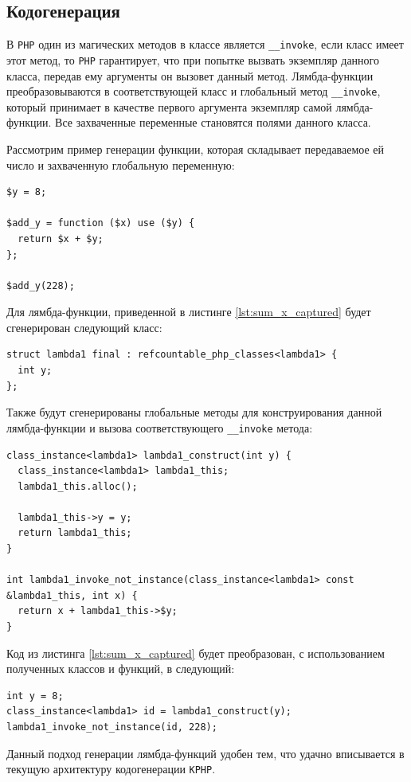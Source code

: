 \subsection{Кодогенерация}
В \verb|PHP| один из магических методов в классе является \verb|__invoke|, если класс имеет этот метод, то \verb|PHP| гарантирует, что при попытке вызвать экземпляр данного класса, передав ему аргументы он вызовет данный метод.
Лямбда-функции преобразовываются в соответствующей класс и глобальный метод \verb|__invoke|, который принимает в качестве первого аргумента экземпляр самой лямбда-функции.
Все захваченные переменные становятся полями данного класса.

Рассмотрим пример генерации функции, которая складывает передаваемое ей число и захваченную глобальную переменную:
\begin{lstlisting}[label={lst:sum_x_captured},caption={Пример функции, добавляющей к аргументу захваченное значение}]
$y = 8;

$add_y = function ($x) use ($y) {
  return $x + $y;
};

$add_y(228);
\end{lstlisting}

Для лямбда-функции, приведенной в листинге \ref{lst:sum_x_captured} будет сгенерирован следующий класс:
\begin{lstlisting}
struct lambda1 final : refcountable_php_classes<lambda1> {
  int y;
};
\end{lstlisting}

Также будут сгенерированы глобальные методы для конструирования данной лямбда-функции и вызова соответствующего \verb|__invoke| метода:
\begin{lstlisting}
class_instance<lambda1> lambda1_construct(int y) {
  class_instance<lambda1> lambda1_this;
  lambda1_this.alloc();

  lambda1_this->y = y;
  return lambda1_this;
}

int lambda1_invoke_not_instance(class_instance<lambda1> const &lambda1_this, int x) {
  return x + lambda1_this->$y;
}
\end{lstlisting}

Код из листинга \ref{lst:sum_x_captured} будет преобразован, с использованием полученных классов и функций, в следующий:
\begin{lstlisting}
int y = 8;
class_instance<lambda1> id = lambda1_construct(y);
lambda1_invoke_not_instance(id, 228);
\end{lstlisting}

Данный подход генерации лямбда-функций удобен тем, что удачно вписывается в текущую архитектуру кодогенерации \verb|KPHP|.

